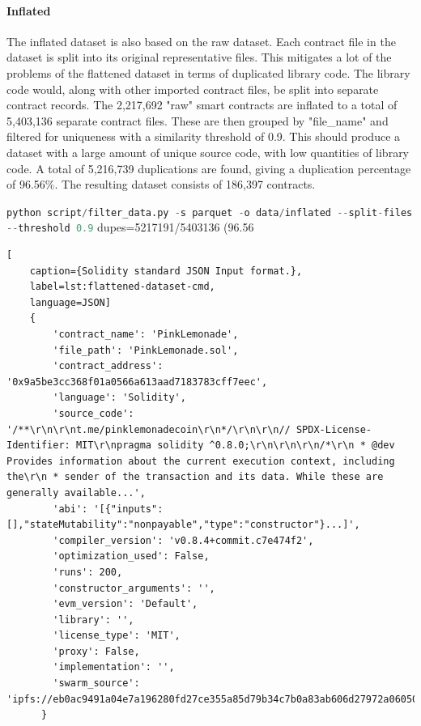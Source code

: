\paragraph{Inflated}
\label{sec:verified-smart-contracts-inflated}
The inflated dataset is also based on the raw dataset. Each contract file in the dataset is split into its original representative files. This mitigates a lot of the problems of the flattened dataset in terms of duplicated library code. The library code would, along with other imported contract files, be split into separate contract records. The 2,217,692 "raw" smart contracts are inflated to a total of 5,403,136 separate contract files. These are then grouped by "file\_name" and filtered for uniqueness with a similarity threshold of 0.9. This should produce a dataset with a large amount of unique source code, with low quantities of library code. A total of 5,216,739 duplications are found, giving a duplication percentage of 96.56\%. The resulting dataset consists of 186,397 contracts.



\lstinline[language=Python]!python script/filter_data.py -s parquet -o data/inflated --split-files --threshold 0.9!
dupes=5217191/5403136 (96.56%


\begin{lstlisting}[
    caption={Solidity standard JSON Input format.},
    label=lst:flattened-dataset-cmd,
    language=JSON]
    {
        'contract_name': 'PinkLemonade',
        'file_path': 'PinkLemonade.sol',
        'contract_address': '0x9a5be3cc368f01a0566a613aad7183783cff7eec',
        'language': 'Solidity',
        'source_code': '/**\r\n\r\nt.me/pinklemonadecoin\r\n*/\r\n\r\n// SPDX-License-Identifier: MIT\r\npragma solidity ^0.8.0;\r\n\r\n\r\n/*\r\n * @dev Provides information about the current execution context, including the\r\n * sender of the transaction and its data. While these are generally available...',
        'abi': '[{"inputs":[],"stateMutability":"nonpayable","type":"constructor"}...]',
        'compiler_version': 'v0.8.4+commit.c7e474f2',
        'optimization_used': False,
        'runs': 200,
        'constructor_arguments': '',
        'evm_version': 'Default',
        'library': '',
        'license_type': 'MIT',
        'proxy': False,
        'implementation': '',
        'swarm_source': 'ipfs://eb0ac9491a04e7a196280fd27ce355a85d79b34c7b0a83ab606d27972a06050c'
      }
      
      
\end{lstlisting}


